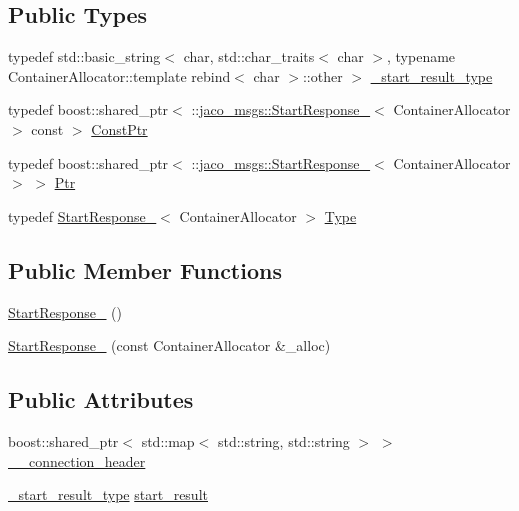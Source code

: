 \subsection*{Public Types}
\begin{DoxyCompactItemize}
\item 
typedef std\+::basic\+\_\+string$<$ char, std\+::char\+\_\+traits$<$ char $>$, typename Container\+Allocator\+::template rebind$<$ char $>$\+::other $>$ \hyperlink{structjaco__msgs_1_1StartResponse___a0aea3a55e33359c555d94d894579ea99}{\+\_\+start\+\_\+result\+\_\+type}
\item 
typedef boost\+::shared\+\_\+ptr$<$ \+::\hyperlink{structjaco__msgs_1_1StartResponse__}{jaco\+\_\+msgs\+::\+Start\+Response\+\_\+}$<$ Container\+Allocator $>$ const  $>$ \hyperlink{structjaco__msgs_1_1StartResponse___a2ad4ef5f394857ba9b607c778511026a}{Const\+Ptr}
\item 
typedef boost\+::shared\+\_\+ptr$<$ \+::\hyperlink{structjaco__msgs_1_1StartResponse__}{jaco\+\_\+msgs\+::\+Start\+Response\+\_\+}$<$ Container\+Allocator $>$ $>$ \hyperlink{structjaco__msgs_1_1StartResponse___a43be1a318899d176a0b268c636d8069f}{Ptr}
\item 
typedef \hyperlink{structjaco__msgs_1_1StartResponse__}{Start\+Response\+\_\+}$<$ Container\+Allocator $>$ \hyperlink{structjaco__msgs_1_1StartResponse___a6b7e90130860f2df1fb0f6591bae9653}{Type}
\end{DoxyCompactItemize}
\subsection*{Public Member Functions}
\begin{DoxyCompactItemize}
\item 
\hyperlink{structjaco__msgs_1_1StartResponse___aa3ae477565e8fa6190bc9b17b8fe6f0e}{Start\+Response\+\_\+} ()
\item 
\hyperlink{structjaco__msgs_1_1StartResponse___a85e1cbb91e89e66d8aab412172ebc4bc}{Start\+Response\+\_\+} (const Container\+Allocator \&\+\_\+alloc)
\end{DoxyCompactItemize}
\subsection*{Public Attributes}
\begin{DoxyCompactItemize}
\item 
boost\+::shared\+\_\+ptr$<$ std\+::map$<$ std\+::string, std\+::string $>$ $>$ \hyperlink{structjaco__msgs_1_1StartResponse___a73d442e9828b4abd9789eb2c6f7ed8b4}{\+\_\+\+\_\+connection\+\_\+header}
\item 
\hyperlink{structjaco__msgs_1_1StartResponse___a0aea3a55e33359c555d94d894579ea99}{\+\_\+start\+\_\+result\+\_\+type} \hyperlink{structjaco__msgs_1_1StartResponse___ada6cfbcf90a2ab058b01adf0b079515c}{start\+\_\+result}
\end{DoxyCompactItemize}


